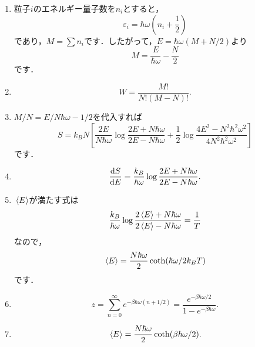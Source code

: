 \documentclass[a4paper,pdflatex,ja=standard]{bxjsarticle}
\begin{document}
\begin{enumerate}
  
  \item 
  粒子$i$のエネルギー量子数を$n_i$とすると，
  \begin{equation}
    \varepsilon_i
    =
    \hbar\omega\left( n_i+\frac{1}{2} \right)
  \end{equation}
  であり，$M=\sum n_i$です．したがって，$E=\hbar\omega(M+N/2)$より
  \begin{equation}
    M
    =
    \frac{E}{\hbar\omega}-\frac{N}{2}
  \end{equation}
  です．

  \item 

  \begin{equation}
    W
    =
    \frac{M!}{N!(M-N)!}
    .
  \end{equation}

  \item 

  $M/N=E/N\hbar\omega-1/2$を代入すれば
  \begin{equation}
    S
    =
    k_B N
    \left[  
      \frac{2E}{N\hbar\omega}
      \log\frac{2E+N\hbar\omega}{2E-N\hbar\omega}
      +
      \frac{1}{2}
      \log\frac{4E^2-N^2\hbar^2\omega^2}{4N^2\hbar^2\omega^2}
    \right]
  \end{equation}
  です．

  \item 

  \begin{equation}
    \dv{S}{E}
    =
    \frac{k_B}{\hbar\omega}
    \log\frac{2E+N\hbar\omega}{2E-N\hbar\omega}
    .
  \end{equation}

  \item 

  $\ev*{E}$が満たす式は
  \begin{equation}
    \frac{k_B}{\hbar\omega}
    \log\frac{2\ev*{E}+N\hbar\omega}{2\ev*{E}-N\hbar\omega}
    =
    \frac{1}{T}
  \end{equation}
  なので，
  \begin{equation}
    \ev*{E}
    =
    \frac{N\hbar\omega}{2}\coth(\hbar\omega/2k_B T)
  \end{equation}
  です．

  \item 

  \begin{equation}
    z
    =
    \sum_{n=0}^{\infty}e^{-\beta\hbar\omega(n+1/2)}
    =
    \frac{e^{-\beta\hbar\omega/2}}{1-e^{-\beta\hbar\omega}}
    .
  \end{equation}

  \item 

  \begin{equation}
    \ev*{E}
    =
    \frac{N\hbar\omega}{2}
    \coth(\beta\hbar\omega/2)
    .
  \end{equation}

\end{enumerate}
\end{document}
